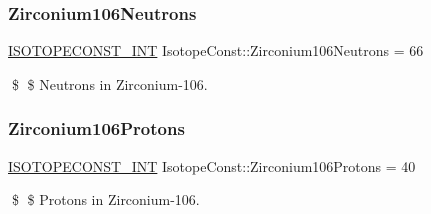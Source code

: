 \subsubsection{\texorpdfstring{Zirconium106\+Neutrons}{Zirconium106Neutrons}}
{\footnotesize\ttfamily \mbox{\hyperlink{group___isotope_const-_macros_ga5f18360b3e99483a35c32d789e62621c}{I\+S\+O\+T\+O\+P\+E\+C\+O\+N\+S\+T\+\_\+\+I\+NT}} Isotope\+Const\+::\+Zirconium106\+Neutrons = 66}

\$ \$ Neutrons in Zirconium-\/106. \mbox{\label{group___isotope_const-_zirconium-_zr106_ga93d61d2bfe002ffacd01eededc04a6d9}} 
\subsubsection{\texorpdfstring{Zirconium106\+Protons}{Zirconium106Protons}}
{\footnotesize\ttfamily \mbox{\hyperlink{group___isotope_const-_macros_ga5f18360b3e99483a35c32d789e62621c}{I\+S\+O\+T\+O\+P\+E\+C\+O\+N\+S\+T\+\_\+\+I\+NT}} Isotope\+Const\+::\+Zirconium106\+Protons = 40}

\$ \$ Protons in Zirconium-\/106. 